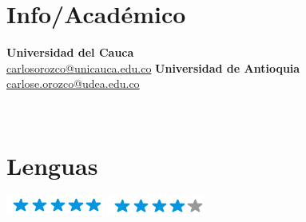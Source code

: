 \documentclass[]{cv-class}
\begin{document}
\begin{aside}
	\section{Info/Académico}
	{} \textbf{Universidad del Cauca} \\
	\href{mailto:carlosorozco@unicauca.edu.co}{carlosorozco@unicauca.edu.co}
	{}\textbf{Universidad de Antioquia} \\
	\href{mailto:carlose.orozco@udea.edu.co}{carlose.orozco@udea.edu.co}

	~
	\section{Lenguas}
	{\includegraphics[scale=0.40]{img/5stars.png}}
	{\includegraphics[scale=0.40]{img/4stars.png}}
	~


\end{aside}
\end{document}
